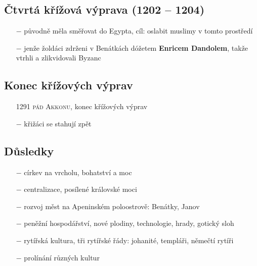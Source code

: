 \documentclass{article}
\begin{document}
\subsection*{Čtvrtá křížová výprava (1202 -- 1204)}
\begin{itemize}
    \vspace{-0.5em}
    \setlength\itemsep{0.15em}
    \item[$-$] původně měla směřovat do Egypta, cíl: oslabit muslimy v tomto prostředí
    \item[$-$] jenže žoldáci zdrženi v Benátkách dóžetem \textbf{Enricem Dandolem}, takže vtrhli a zlikvidovali Byzanc
\end{itemize}


\subsection*{Konec křížových výprav}
\begin{itemize}
    \vspace{-0.5em}
    \setlength\itemsep{0.15em}
    \item[1291] \textsc{pád Akkonu}, konec křížových výprav
    \item[$-$] křižáci se stahují zpět
\end{itemize}


\subsection*{Důsledky}
\begin{itemize}
    \vspace{-0.5em}
    \setlength\itemsep{0.15em}
    \item[$-$] církev na vrcholu, bohatství a moc
    \item[$-$] centralizace, posílené královské moci
    \item[$-$] rozvoj měst na Apeninském poloostrově: Benátky, Janov
    \item[$-$] peněžní hospodářství, nové plodiny, technologie, hrady, gotický sloh
    \item[$-$] rytířská kultura, tři rytířské řády: johanité, templáři, němečtí rytíři
    \item[$-$] prolínání různých kultur
\end{itemize}
\end{document}
